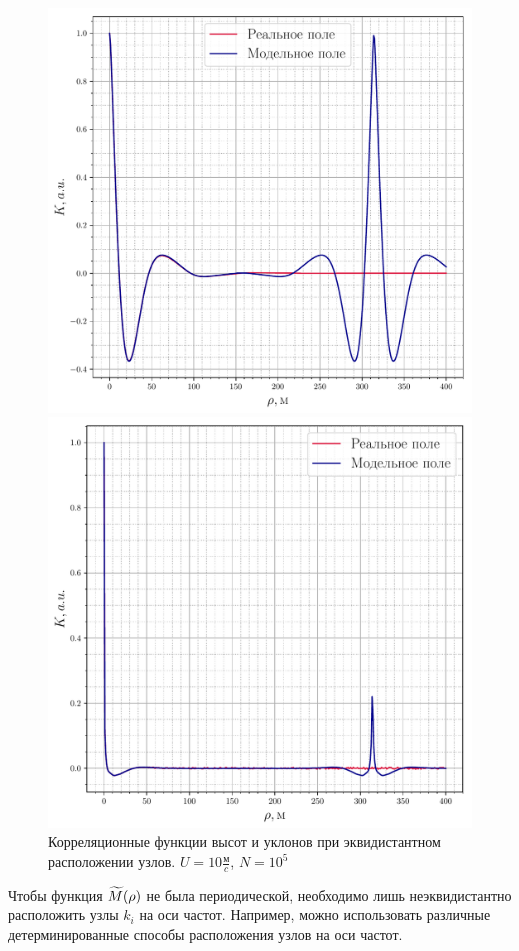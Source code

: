 \begin{figure}[h!]
	\begin{minipage}{0.49\linewidth}
			\centering
			\includegraphics[width=\linewidth]{fig/correlation_height5_slopes2.pdf}
	\end{minipage}
	\hfill
	\begin{minipage}{0.49\linewidth}
			\centering
			\includegraphics[width=\linewidth]{fig/correlation_angles5_slopes2.pdf}
	\end{minipage}
	\caption{Корреляционные функции высот и уклонов при эквидистантном расположении узлов. $U=10 \frac{\text{м}}{c}$, $N=10^5$}
	\label{fig:ca05}		
\end{figure}
Чтобы функция $\widetilde{M}(\rho)$ не была периодической, необходимо лишь неэквидистантно расположить узлы $k_i$ на оси частот. Например, можно использовать различные детерминированные способы расположения узлов на оси частот.

